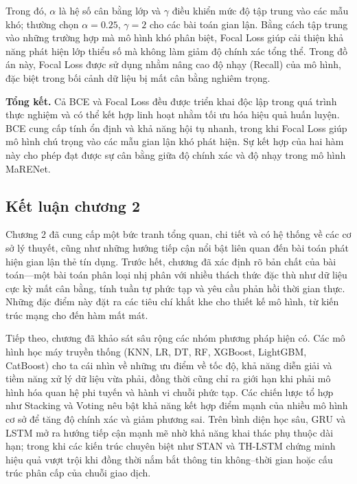 Trong đó, \(\alpha\) là hệ số cân bằng lớp và \(\gamma\) điều khiển mức độ tập trung vào các mẫu khó; thường chọn \(\alpha = 0.25\), \(\gamma = 2\) cho các bài toán gian lận. Bằng cách tập trung vào những trường hợp mà mô hình khó phân biệt, Focal Loss giúp cải thiện khả năng phát hiện lớp thiểu số mà không làm giảm độ chính xác tổng thể. Trong đồ án này, Focal Loss được sử dụng nhằm nâng cao độ nhạy (Recall) của mô hình, đặc biệt trong bối cảnh dữ liệu bị mất cân bằng nghiêm trọng.

\vspace{0.5em}

\textbf{Tổng kết.} Cả BCE và Focal Loss đều được triển khai độc lập trong quá trình thực nghiệm và có thể kết hợp linh hoạt nhằm tối ưu hóa hiệu quả huấn luyện. BCE cung cấp tính ổn định và khả năng hội tụ nhanh, trong khi Focal Loss giúp mô hình chú trọng vào các mẫu gian lận khó phát hiện. Sự kết hợp của hai hàm này cho phép đạt được sự cân bằng giữa độ chính xác và độ nhạy trong mô hình MaRENet.



\subsection{Kết luận chương 2}


Chương 2 đã cung cấp một bức tranh tổng quan, chi tiết và có hệ thống về các cơ sở lý thuyết, cũng như những hướng tiếp cận nổi bật liên quan đến bài toán phát hiện gian lận thẻ tín dụng. Trước hết, chương đã xác định rõ bản chất của bài toán—một bài toán phân loại nhị phân với nhiều thách thức đặc thù như dữ liệu cực kỳ mất cân bằng, tính tuần tự phức tạp và yêu cầu phản hồi thời gian thực. Những đặc điểm này đặt ra các tiêu chí khắt khe cho thiết kế mô hình, từ kiến trúc mạng cho đến hàm mất mát.

Tiếp theo, chương đã khảo sát sâu rộng các nhóm phương pháp hiện có. Các mô hình học máy truyền thống (KNN, LR, DT, RF, XGBoost, LightGBM, CatBoost) cho ta cái nhìn về những ưu điểm về tốc độ, khả năng diễn giải và tiềm năng xử lý dữ liệu vừa phải, đồng thời cũng chỉ ra giới hạn khi phải mô hình hóa quan hệ phi tuyến và hành vi chuỗi phức tạp. Các chiến lược tổ hợp như Stacking và Voting nêu bật khả năng kết hợp điểm mạnh của nhiều mô hình cơ sở để tăng độ chính xác và giảm phương sai. Trên bình diện học sâu, GRU và LSTM mở ra hướng tiếp cận mạnh mẽ nhờ khả năng khai thác phụ thuộc dài hạn; trong khi các kiến trúc chuyên biệt như STAN và TH-LSTM chứng minh hiệu quả vượt trội khi đồng thời nắm bắt thông tin không–thời gian hoặc cấu trúc phân cấp của chuỗi giao dịch.

